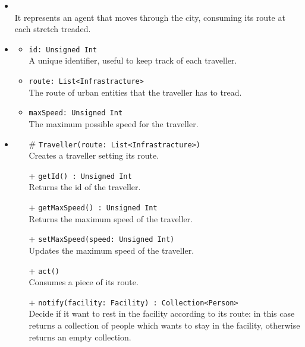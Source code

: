 \begin{itemize}
  \item \textbf{\descr} \\
    It represents an agent that moves through the city, consuming its 
route at each stretch treaded.
  \item \textbf{\attrs}
  \begin{itemize}
    \item \texttt{id: Unsigned Int} \\
A unique identifier, useful to keep track of each traveller.
    \item \texttt{route: List<Infrastracture>} \\
The route of urban entities that the traveller has to tread.
    \item \texttt{maxSpeed: Unsigned Int} \\
The maximum possible speed for the traveller.
  \end{itemize}
  \item \textbf{\ops}
  \begin{itemize}
  \item[\#]  \texttt{Traveller(route: List<Infrastracture>)} \\
Creates a traveller setting its route.
    \item[+] \texttt{getId() : Unsigned Int} \\
Returns the id of the traveller.
   \item[+] \texttt{getMaxSpeed() : Unsigned Int} \\
Returns the maximum speed of the traveller.
    \item[+] \texttt{setMaxSpeed(speed: Unsigned Int)} \\
Updates the maximum speed of the traveller.
    \item[+]  \texttt{act()} \\
Consumes a piece of its route.
    \item[+] \texttt{notify(facility: Facility) : Collection<Person>} \\
Decide if it want to rest in the facility according to its route: in this case
returns a collection of people which wants to stay in the facility, otherwise returns
an empty collection.
  \end{itemize}
\end{itemize}
